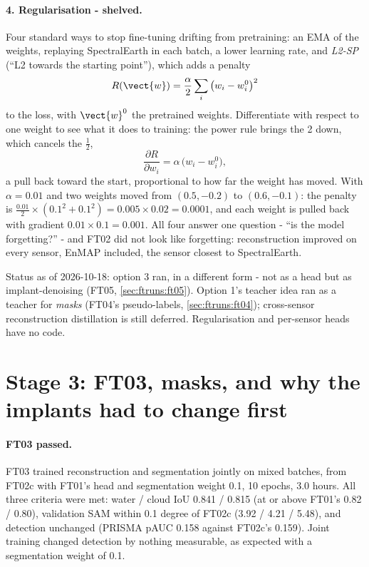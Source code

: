 \paragraph{4. Regularisation - shelved.} 
Four standard ways to stop fine-tuning drifting from pretraining: an EMA of the weights, replaying SpectralEarth in
each batch, a lower learning rate, and \emph{L2-SP} (``L2 towards the starting point''), which adds a penalty
\begin{equation}
R(\vect{w}) = \frac{\alpha}{2} \sum_i \big(w_i - w_i^{0}\big)^2 \label{eq:ftruns:l2sp}
\end{equation}
to the loss, with $\vect{w}^0$ the pretrained weights. Differentiate with respect to one weight to see what it does
to training: the power rule brings the 2 down, which cancels the $\tfrac12$,
\[
\frac{\partial R}{\partial w_i} = \alpha\,\big(w_i - w_i^0\big),
\]
a pull back toward the start, proportional to how far the weight has moved. With $\alpha = 0.01$ and two weights moved
from $(0.5, -0.2)$ to $(0.6, -0.1)$: the penalty is $\frac{0.01}{2} \times (0.1^2 + 0.1^2) = 0.005 \times 0.02 =
0.0001$, and each weight is pulled back with gradient $0.01 \times 0.1 = 0.001$. All four answer one question - ``is
the model forgetting?'' - and FT02 did not look like forgetting: reconstruction improved on every sensor, EnMAP
included, the sensor closest to SpectralEarth.

\begin{drift}
Status as of 2026-10-18: option 3 ran, in a different form - not as a head but as implant-denoising (FT05,
\cref{sec:ftruns:ft05}). Option 1's teacher idea ran as a teacher for \emph{masks} (FT04's pseudo-labels,
\cref{sec:ftruns:ft04}); cross-sensor reconstruction distillation is still deferred. Regularisation and per-sensor heads
have no code.
\end{drift}

\section{Stage 3: FT03, masks, and why the implants had to change first}\label{sec:ftruns:stage3}

\paragraph{FT03 passed.} FT03 trained reconstruction and segmentation jointly on mixed batches, from FT02c with FT01's
head and segmentation weight 0.1, 10 epochs, 3.0 hours. All three criteria were met: water / cloud IoU 0.841 / 0.815
(at or above FT01's 0.82 / 0.80), validation SAM within 0.1 degree of FT02c (3.92 / 4.21 / 5.48), and detection
unchanged (PRISMA pAUC 0.158 against FT02c's 0.159).
Joint training changed detection by nothing measurable, as expected with a segmentation weight of 0.1.

